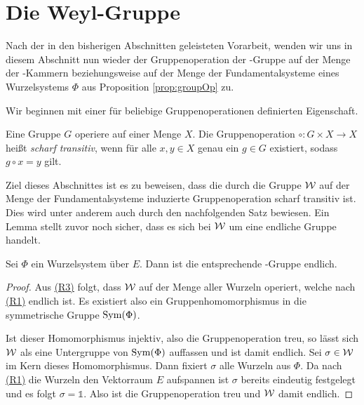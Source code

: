 \newpage
\section{Die Weyl-Gruppe}
\label{sec:weylgroup}

Nach der in den bisherigen Abschnitten geleisteten Vorarbeit, wenden wir uns in diesem Abschnitt nun wieder der Gruppenoperation der \weyl\hyp{}Gruppe auf der Menge der \weyl\hyp{}Kammern beziehungsweise auf der Menge der Fundamentalsysteme eines Wurzelsystems $\Phi$ aus Proposition \ref{prop:groupOp} zu.

Wir beginnen mit einer für beliebige Gruppenoperationen definierten Eigenschaft.

\begin{defn}
  Eine Gruppe $G$ operiere auf einer Menge $X$.
  Die Gruppenoperation $\circ \colon G \times X \to X$ heißt \emph{scharf transitiv}, wenn für alle $x,y \in X$ genau ein $g \in G$ existiert, sodass $g \circ x = y$ gilt. 
\end{defn}

Ziel dieses Abschnittes ist es zu beweisen, dass die durch die Gruppe $\mathcal{W}$ auf der Menge der Fundamentalsysteme induzierte Gruppenoperation scharf transitiv ist.
Dies wird unter anderem auch durch den nachfolgenden Satz bewiesen.
Ein Lemma stellt zuvor noch sicher, dass es sich bei $\mathcal{W}$ um eine endliche Gruppe handelt.

\begin{lem}
  \label{lem:weylFinite}
  Sei $\Phi$ ein Wurzelsystem über $E$. Dann ist die entsprechende \weyl\hyp{}Gruppe endlich. 
\end{lem}

\begin{proof}
  Aus \hyperref[it:R3]{(R3)} folgt, dass $\mathcal{W}$ auf der Menge aller Wurzeln operiert, welche nach \hyperref[it:R1]{(R1)} endlich ist.
  Es existiert also ein Gruppenhomomorphismus in die symmetrische Gruppe $\operatorname{Sym}(\Phi)$.

  Ist dieser Homomorphismus injektiv, also die Gruppenoperation treu, so lässt sich $\mathcal{W}$ als eine Untergruppe von $\operatorname{Sym}(\Phi)$ auffassen und ist damit endlich.
  Sei $\sigma \in \mathcal{W}$ im Kern dieses Homomorphismus.
  Dann fixiert $\sigma$ alle Wurzeln aus $\Phi$.
  Da nach \hyperref[it:R1]{(R1)} die Wurzeln den Vektorraum $E$ aufspannen ist $\sigma$ bereits eindeutig festgelegt und es folgt $\sigma = \mathds{1}$.
  Also ist die Gruppenoperation treu und $\mathcal{W}$ damit endlich.
\end{proof}

